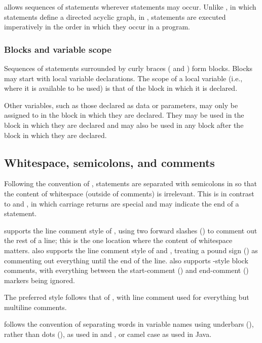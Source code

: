 \documentclass[article]{jss}
\begin{document}
 allows sequences of statements wherever statements may
occur. Unlike , in which statements define a directed
acyclic graph, in , statements are executed
imperatively in the order in which they occur in a program.

\subsubsection{Blocks and variable scope}

Sequences of statements surrounded by curly braces (\code{\{} and
\code{\}}) form blocks.  Blocks may start with local variable
declarations.  The scope of a local variable (i.e., where it is
available to be used) is that of the block in which it is declared.

Other variables, such as those declared as data or parameters, may
only be assigned to in the block in which they are declared.  They may
be used in the block in which they are declared and may also be used
in any block after the block in which they are declared.


\subsection{Whitespace, semicolons, and comments}

Following the convention of , statements are separated
with semicolons in  so that the content of whitespace
(outside of comments) is irrelevant.  This is in contrast to
 and , in which carriage returns are
special and may indicate the end of a statement.

 supports the line comment style of ,
using two forward slashes (\code{//}) to comment out the rest of a
line; this is the one location where the content of whitespace
matters.   also supports the line comment style of  and
, treating a pound sign (\code{\#}) as commenting out
everything until the end of the line.   also supports
-style block comments, with everything between the
start-comment (\code{/*}) and end-comment (\code{*/}) markers being
ignored. 

The preferred style follows that of , with line comment
used for everything but multiline comments.  

 follows the  convention of separating words in
variable names using underbars (\code{\_}), rather than dots
(), as used in  and , or camel case
as used in Java.
\end{document}
